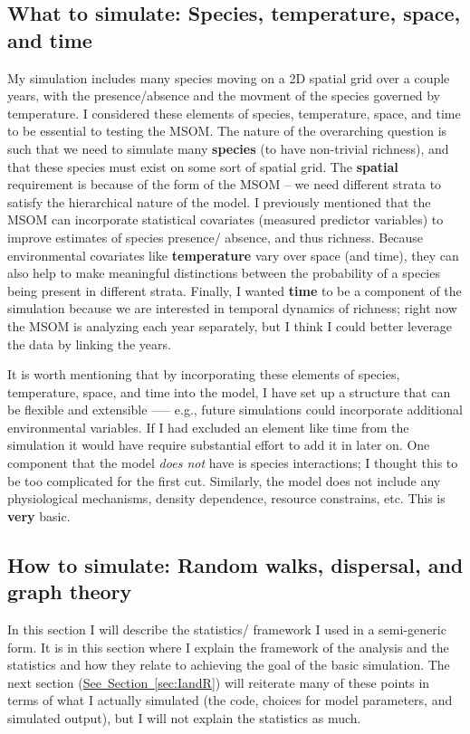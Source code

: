 \documentclass{article}\usepackage[]{graphicx}\usepackage[]{color}
\begin{document}
\subsection{What to simulate: Species, temperature, space, and time}
\par
My simulation includes many species moving on a 2D spatial grid over a couple years, with the presence/absence and the movment of the species governed by temperature. I considered these elements of species, temperature, space, and time to be essential to testing the MSOM. The nature of the overarching question is such that we need to simulate many \textbf{species} (to have non-trivial richness), and that these species must exist on some sort of spatial grid. The \textbf{spatial} requirement is because of the form of the MSOM -- we need different strata to satisfy the hierarchical nature of the model. I previously mentioned that the MSOM can incorporate statistical covariates (measured predictor variables) to improve estimates of species presence/ absence, and thus richness. Because environmental covariates like \textbf{temperature} vary over space (and time), they can also help to make meaningful distinctions between the probability of a species being present in different strata. Finally, I wanted \textbf{time} to be a component of the simulation because we are interested in temporal dynamics of richness; right now the MSOM is analyzing each year separately, but I think I could better leverage the data by linking the years.

\par
It is worth mentioning that by incorporating these elements of species, temperature, space, and time into the model, I have set up a structure that can be flexible and extensible –--- e.g., future simulations could incorporate additional environmental variables. If I had excluded an element like time from the simulation it would have require substantial effort to add it in later on. One component that the model \emph{does not} have is species interactions; I thought this to be too complicated for the first cut. Similarly, the model does not include any physiological mechanisms, density dependence, resource constrains, etc. This is \textbf{very} basic.

\subsection{How to simulate: Random walks, dispersal, and graph theory}
In this section I will describe the statistics/ framework I used in a semi-generic form. It is in this section where I explain the framework of the analysis and the statistics and how they relate to achieving the goal of the basic simulation. The next section (\hyperref[sec:IandR]{See~Section~\ref{sec:IandR}}) will reiterate many of these points in terms of what I actually simulated (the code, choices for model parameters, and simulated output), but I will not explain the statistics as much.
\end{document}
